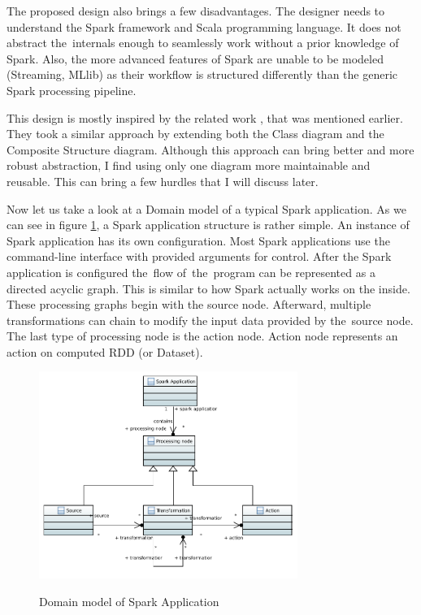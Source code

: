 The proposed design also brings a few disadvantages. The designer needs to understand the Spark framework and Scala programming language. It does not abstract the~internals enough to seamlessly work without a prior knowledge of Spark. Also, the more advanced features of Spark are unable to be modeled (Streaming, MLlib) as their workflow is structured differently than the generic Spark processing pipeline.

This design is mostly inspired by the related work \cite{streamgen}, that was mentioned earlier. They took a similar approach by extending both the Class diagram and the Composite Structure diagram. Although this approach can bring better and more robust abstraction, I find using only one diagram more maintainable and reusable. This can bring a few hurdles that I will discuss later.


Now let us take a look at a Domain model of a typical Spark application. As we can see in figure \ref{fig:domain-model}, a Spark application structure is rather simple. An instance of Spark application has its own configuration. Most Spark applications use the command-line interface with provided arguments for control. After the Spark application is configured the~flow of~the~program can be represented as a directed acyclic graph. This is similar to how Spark actually works on the inside. These processing graphs begin with the source node. Afterward,  multiple transformations can chain to modify the input data provided by the~source node. The last type of processing node is the action node. Action node represents an action on computed RDD (or Dataset). 


\begin{figure}[H]
\centering  
\includegraphics[width=0.75\textwidth]{obrazky-figures/Class_Diagram_0.pdf}
\label{fig:domain-model}
\caption{Domain model of Spark Application}
\end{figure}


